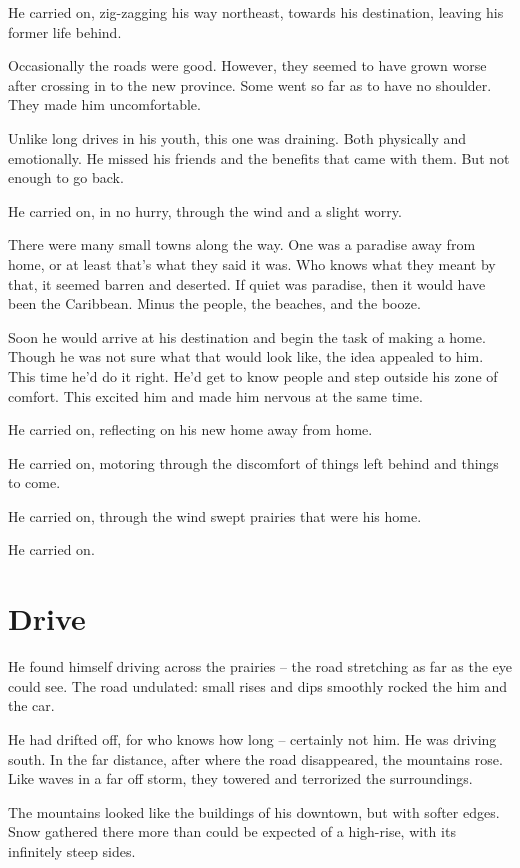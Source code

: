 \documentclass[fontsize=12pt,english]{scrreprt}
\begin{document}
He carried on, zig-zagging his way northeast, towards his destination,
leaving his former life behind.

Occasionally the roads were good. However, they seemed to have grown
worse after crossing in to the new province. Some went so far as to
have no shoulder. They made him uncomfortable.

Unlike long drives in his youth, this one was draining. Both
physically and emotionally. He missed his friends and the benefits
that came with them. But not enough to go back.

He carried on, in no hurry, through the wind and a slight worry.

There were many small towns along the way. One was a paradise away
from home, or at least that's what they said it was. Who knows what
they meant by that, it seemed barren and deserted. If quiet was
paradise, then it would have been the Caribbean. Minus the people, the
beaches, and the booze.

Soon he would arrive at his destination and begin the task of making a
home. Though he was not sure what that would look like, the idea
appealed to him. This time he'd do it right. He'd get to know people
and step outside his zone of comfort. This excited him and made him
nervous at the same time.

He carried on, reflecting on his new home away from home.

He carried on, motoring through the discomfort of things left behind
and things to come.

He carried on, through the wind swept prairies that were his home.

He carried on.

\newpage

\section{Drive}

He found himself driving across the prairies -- the road stretching as
far as the eye could see. The road undulated: small rises and dips
smoothly rocked the him and the car.

He had drifted off, for who knows how long -- certainly not him. He
was driving south. In the far distance, after where the road
disappeared, the mountains rose. Like waves in a far off storm, they
towered and terrorized the surroundings.

The mountains looked like the buildings of his downtown, but with
softer edges. Snow gathered there more than could be expected of a
high-rise, with its infinitely steep sides.
\end{document}
